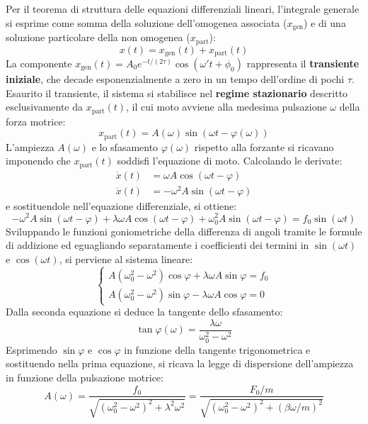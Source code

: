 Per il teorema di struttura delle equazioni differenziali lineari, l'integrale generale si esprime come somma della soluzione dell'omogenea associata ($x_{\text{gen}}$) e di una soluzione particolare della non omogenea ($x_{\text{part}}$):
\begin{equation}
    x(t) = x_{\text{gen}}(t) + x_{\text{part}}(t)
\end{equation}
La componente $x_{\text{gen}}(t) = A_0 e^{-t/(2\tau)}\cos(\omega' t + \phi_0)$ rappresenta il \textbf{transiente iniziale}, che decade esponenzialmente a zero in un tempo dell'ordine di pochi $\tau$. Esaurito il transiente, il sistema si stabilisce nel \textbf{regime stazionario} descritto esclusivamente da $x_{\text{part}}(t)$, il cui moto avviene alla medesima pulsazione $\omega$ della forza motrice:
\begin{equation}
    x_{\text{part}}(t) = A(\omega) \sin(\omega t - \varphi(\omega))
\end{equation}
L'ampiezza $A(\omega)$ e lo sfasamento $\varphi(\omega)$ rispetto alla forzante si ricavano imponendo che $x_{\text{part}}(t)$ soddisfi l'equazione di moto. Calcolando le derivate:
\begin{align*}
\dot{x}(t) &= \omega A \cos(\omega t - \varphi) \\
\ddot{x}(t) &= -\omega^2 A \sin(\omega t - \varphi)
\end{align*}
e sostituendole nell'equazione differenziale, si ottiene:
\begin{equation}
    -\omega^2 A \sin(\omega t - \varphi) + \lambda\omega A \cos(\omega t - \varphi) + \omega_0^2 A \sin(\omega t - \varphi) = f_0 \sin(\omega t)
\end{equation}
Sviluppando le funzioni goniometriche della differenza di angoli tramite le formule di addizione ed eguagliando separatamente i coefficienti dei termini in $\sin(\omega t)$ e $\cos(\omega t)$, si perviene al sistema lineare:
\begin{equation}
    \begin{cases}
A(\omega_0^2 - \omega^2)\cos\varphi + \lambda\omega A\sin\varphi = f_0 \\
A(\omega_0^2 - \omega^2)\sin\varphi - \lambda\omega A\cos\varphi = 0
\end{cases}
\end{equation}
Dalla seconda equazione si deduce la tangente dello sfasamento:
\begin{equation}
    \tan\varphi(\omega) = \frac{\lambda\omega}{\omega_0^2 - \omega^2}
\end{equation}
Esprimendo $\sin\varphi$ e $\cos\varphi$ in funzione della tangente trigonometrica e sostituendo nella prima equazione, si ricava la legge di dispersione dell'ampiezza in funzione della pulsazione motrice:
\begin{equation}
    A(\omega) = \frac{f_0}{\sqrt{(\omega_0^2 - \omega^2)^2 + \lambda^2\omega^2}} = \frac{F_0 / m}{\sqrt{(\omega_0^2 - \omega^2)^2 + (\beta\omega/m)^2}}
\end{equation}

